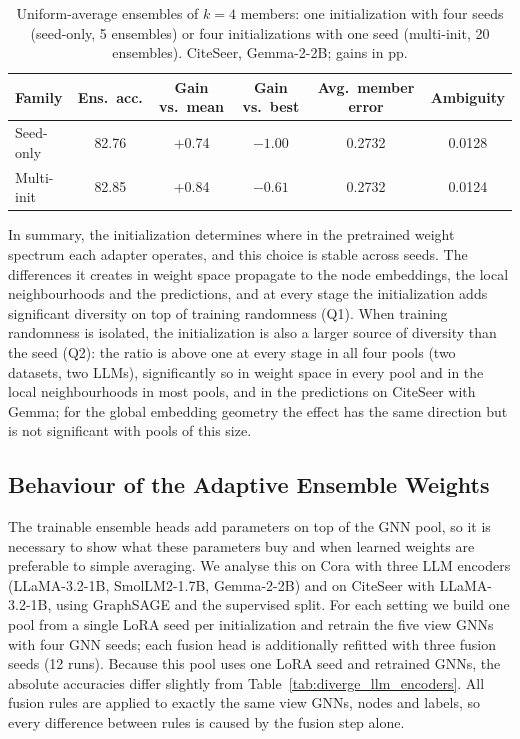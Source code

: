 \documentclass[a4paper,fleqn]{cas-sc}
\DeclareRobustCommand{\revcommon}[2][]{\textcolor{revshared}{#2}} %
\begin{document}
\begin{table}[htbp]
\centering\color{revshared}
\caption{Uniform-average ensembles of $k=4$ members: one initialization with four seeds (seed-only, 5 ensembles) or four initializations with one seed (multi-init, 20 ensembles). CiteSeer, Gemma-2-2B; gains in pp.}
\label{tab:seed_multi_ensemble}
\small
\begin{tabular}{lccccc}
\toprule
\textbf{Family} & \textbf{Ens.\ acc.} & \textbf{Gain vs.\ mean} & \textbf{Gain vs.\ best} & \textbf{Avg.\ member error} & \textbf{Ambiguity} \\
\midrule
Seed-only  & 82.76 & +0.74 & $-1.00$ & 0.2732 & 0.0128 \\
Multi-init & 82.85 & +0.84 & $-0.61$ & 0.2732 & 0.0124 \\
\bottomrule
\end{tabular}
\end{table}

\revcommon[R1,R2,R4]{In summary, the initialization determines where in the pretrained weight spectrum each adapter operates, and this choice is stable across seeds. The differences it creates in weight space propagate to the node embeddings, the local neighbourhoods and the predictions, and at every stage the initialization adds significant diversity on top of training randomness (Q1). When training randomness is isolated, the initialization is also a larger source of diversity than the seed (Q2): the ratio is above one at every stage in all four pools (two datasets, two LLMs), significantly so in weight space in every pool and in the local neighbourhoods in most pools, and in the predictions on CiteSeer with Gemma; for the global embedding geometry the effect has the same direction but is not significant with pools of this size.}

\subsection{\revcommon{Behaviour of the Adaptive Ensemble Weights}}
\label{sec:ensemble_weight_analysis}

\revcommon[R1,R2,R4]{The trainable ensemble heads add parameters on top of the GNN pool, so it is necessary to show what these parameters buy and when learned weights are preferable to simple averaging. We analyse this on Cora with three LLM encoders (LLaMA-3.2-1B, SmolLM2-1.7B, Gemma-2-2B) and on CiteSeer with LLaMA-3.2-1B, using GraphSAGE and the supervised split. For each setting we build one pool from a single LoRA seed per initialization and retrain the five view GNNs with four GNN seeds; each fusion head is additionally refitted with three fusion seeds (12 runs). Because this pool uses one LoRA seed and retrained GNNs, the absolute accuracies differ slightly from Table~\ref{tab:diverge_llm_encoders}. All fusion rules are applied to exactly the same view GNNs, nodes and labels, so every difference between rules is caused by the fusion step alone.}
\end{document}
